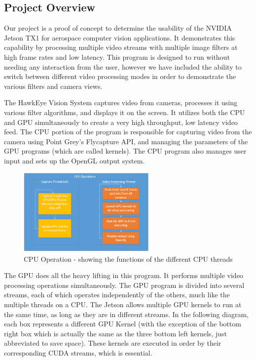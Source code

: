 \subsection{Project Overview}
Our project is a proof of concept to determine the usability of the NVIDIA Jetson TX1 for aerospace computer vision applications.  It demonstrates this capability by processing multiple video streams with multiple image filters at high frame rates and low latency. This program is designed to run without needing any interaction from the user, however we have included the ability to switch between different video processing modes in order to demonstrate the various filters and camera views.
\par
The HawkEye Vision System captures video from cameras, processes it using various filter algorithms, and displays it on the screen. It utilizes both the CPU and GPU simultaneously to create a very high throughput, low latency video feed. The CPU portion of the program is responsible for capturing video from the camera using Point Grey's Flycapture API, and managing the parameters of the GPU programs (which are called kernels). The CPU program also manages user input and sets up the OpenGL output system. 

\begin{figure}[H] 
	\centering
	\includegraphics[width=0.6\textwidth,natwidth=610,natheight=642]{images/CPU.png} 
	\caption{CPU Operation - showing the functions of the different CPU threads}  
	\end{figure}
	
The GPU does all the heavy lifting in this program. It performs multiple video processing operations simultaneously. The GPU program is divided into several streams, each of which operates independently of the others, much like the multiple threads on a CPU. The Jetson allows multiple GPU kernels to run at the same time, as long as they are in different streams.
In the following diagram, each box represents a different GPU Kernel (with the exception of the bottom right box which is actually the same as the three bottom left kernels, just abbreviated to save space). These kernels are executed in order by their corresponding CUDA streams, which is essential. 
	
